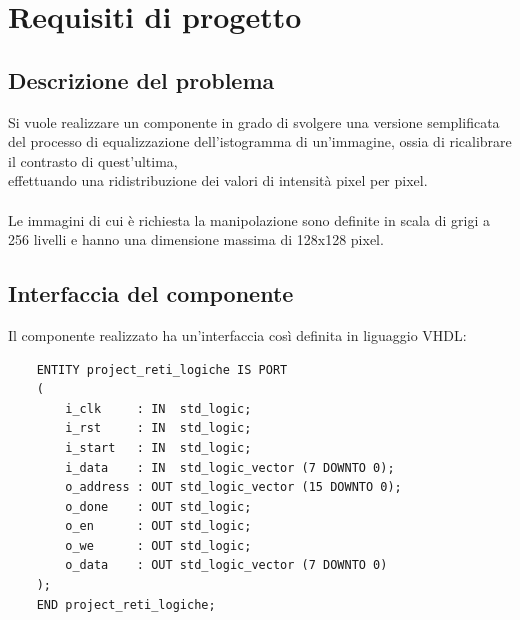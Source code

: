 \documentclass{article}
\begin{document}
\section{Requisiti di progetto} %

\subsection{Descrizione del problema} %
Si vuole realizzare un componente in grado di svolgere una versione semplificata del processo di equalizzazione dell’istogramma di un’immagine, ossia di ricalibrare il contrasto di quest’ultima, \\effettuando una ridistribuzione dei valori di intensità pixel per pixel. \\\\
Le immagini di cui è richiesta la manipolazione sono definite in scala di grigi a 256 livelli e hanno una dimensione massima di 128x128 pixel.

\vspace{0,5cm} %

\subsection{Interfaccia del componente} %
Il componente realizzato ha un’interfaccia così definita in liguaggio VHDL:

\begin{verbatim}
    ENTITY project_reti_logiche IS PORT
	(
		i_clk     : IN  std_logic;
		i_rst     : IN  std_logic; 
		i_start   : IN  std_logic; 
		i_data    : IN  std_logic_vector (7 DOWNTO 0);
		o_address : OUT std_logic_vector (15 DOWNTO 0);
		o_done    : OUT std_logic; 
		o_en      : OUT std_logic;
		o_we      : OUT std_logic;
		o_data    : OUT std_logic_vector (7 DOWNTO 0) 
	);
    END project_reti_logiche;
\end{verbatim}

\vspace{0,5cm} %
\end{document}
